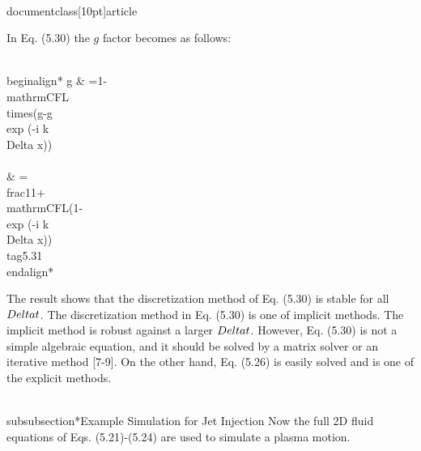 \\documentclass[10pt]{article}
\begin{document}
{In Eq. (5.30) the $g$ factor becomes as follows:


\\begin{align*}
g & =1-\\mathrm{CFL} \\times(g-g \\exp (-i k \\Delta x)) \\\\
& =\\frac{1}{1+\\mathrm{CFL}(1-\\exp (-i k \\Delta x))} \\tag{5.31}
\\end{align*}


The result shows that the discretization method of Eq. (5.30) is stable for all $\\Delta t$. The discretization method in Eq. (5.30) is one of implicit methods. The implicit method is robust against a larger $\\Delta t$. However, Eq. (5.30) is not a simple algebraic equation, and it should be solved by a matrix solver or an iterative method [7-9]. On the other hand, Eq. (5.26) is easily solved and is one of the explicit methods.

\\subsubsection*{Example Simulation for Jet Injection}
Now the full 2D fluid equations of Eqs. (5.21)-(5.24) are used to simulate a plasma motion.

}
\end{document}

